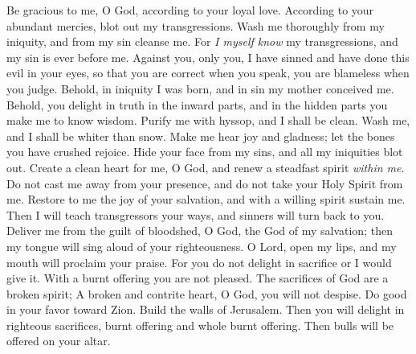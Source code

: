 \begin{biblechapter} %
 Be gracious to me, O God, according to your loyal love. 
According to your abundant mercies, 
blot out my transgressions.
\verse Wash me thoroughly from my iniquity, 
and from my sin cleanse me.
\verse For \textit{I myself know} my transgressions, 
and my sin is ever before me.
\verse Against you, only you, I have sinned 
and have done this evil in your eyes, 
so that you are correct when you speak, 
you are blameless when you judge.
\verse Behold, in iniquity I was born, 
and in sin my mother conceived me.
\verse Behold, you delight in truth in the inward parts, 
and in the hidden parts you make me to know wisdom.
\verse Purify me with hyssop, and I shall be clean. 
Wash me, and I shall be whiter than snow.
\verse Make me hear joy and gladness; 
let the bones you have crushed rejoice.
\verse Hide your face from my sins, 
and all my iniquities blot out.
\verse Create a clean heart for me, O God, 
and renew a steadfast spirit \textit{within me}.
\verse Do not cast me away from your presence, 
and do not take your Holy Spirit from me.
\verse Restore to me the joy of your salvation, 
and with a willing spirit sustain me.
\verse Then I will teach transgressors your ways, 
and sinners will turn back to you.
\verse Deliver me from the guilt of bloodshed, O God, 
the God of my salvation; 
then my tongue will sing aloud of your righteousness.
\verse O Lord, open my lips, 
and my mouth will proclaim your praise.
\verse For you do not delight in sacrifice or I would give it. 
With a burnt offering you are not pleased.
\verse The sacrifices of God are a broken spirit; 
A broken and contrite heart, 
O God, you will not despise.
\verse Do good in your favor toward Zion. 
Build the walls of Jerusalem.
\verse Then you will delight in righteous sacrifices, 
burnt offering and whole burnt offering. 
Then bulls will be offered on your altar.
\end{biblechapter}

